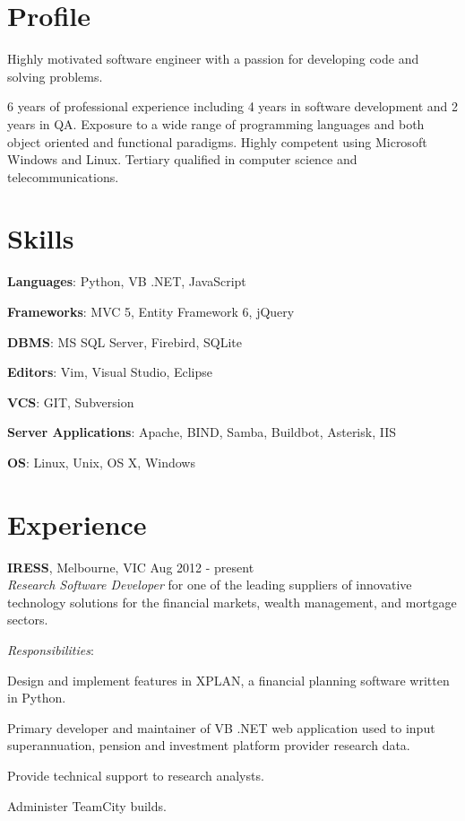 \documentclass[line,margin]{res}
\begin{document}
    \address{ablack@fastmail.net}
    \address{0401 868 343}

    \begin{resume}
        \section{Profile}
        Highly motivated software engineer with a passion for developing code and solving problems.

        6 years of professional experience including 4 years in software development and 2 years in
        QA. Exposure to a wide range of programming languages and both object oriented and functional
        paradigms. Highly competent using Microsoft Windows and Linux. Tertiary qualified in computer
        science and telecommunications.

        \section{Skills}
        \begin{list}{}{\leftmargin=1em \itemsep=-2pt}
            \item{\textbf{Languages}: Python, VB .NET, JavaScript}
            \item{\textbf{Frameworks}: MVC 5, Entity Framework 6, jQuery}
            \item{\textbf{DBMS}: MS SQL Server, Firebird, SQLite}
            \item{\textbf{Editors}: Vim, Visual Studio, Eclipse}
            \item{\textbf{VCS}: GIT, Subversion}
            \item{\textbf{Server Applications}: Apache, BIND, Samba, Buildbot, Asterisk, IIS}
            \item{\textbf{OS}: Linux, Unix, OS X, Windows}
        \end{list}

        \section{Experience}
        \textbf{IRESS}, Melbourne, VIC \hfill Aug 2012 - present \\
        \textit{Research Software Developer} for one of the leading suppliers of innovative technology
        solutions for the financial markets, wealth management, and mortgage sectors.

        \textit{Responsibilities}:
        \begin{list}{}{\leftmargin=1em \itemsep=-2pt}
            \item{Design and implement features in XPLAN, a financial planning software written in Python.}
            \item{Primary developer and maintainer of VB .NET web application used to input superannuation,
            pension and investment platform provider research data.}
            \item{Provide technical support to research analysts.}
            \item{Administer TeamCity builds.}
        \end{list}


\end{resume}
\end{document}
